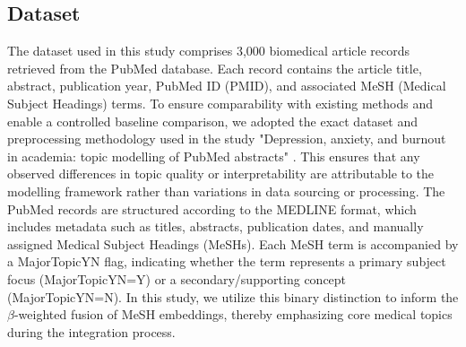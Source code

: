 \documentclass[utf8]{FrontiersinHarvard}
\begin{document}
\subsection{Dataset}
The dataset used in this study comprises 3,000 biomedical article records retrieved from the PubMed database. Each record contains the article title, abstract, publication year, PubMed ID (PMID), and associated MeSH (Medical Subject Headings) terms. To ensure comparability with existing methods and enable a controlled baseline comparison, we adopted the exact dataset and preprocessing methodology used in the study "Depression, anxiety, and burnout in academia: topic modelling of PubMed abstracts" \citep{ma_ai-powered_2025}. This ensures that any observed differences in topic quality or interpretability are attributable to the modelling framework rather than variations in data sourcing or processing.
The PubMed records are structured according to the MEDLINE format, which includes metadata such as titles, abstracts, publication dates, and manually assigned Medical Subject Headings (MeSHs). Each MeSH term is accompanied by a MajorTopicYN flag, indicating whether the term represents a primary subject focus (MajorTopicYN=Y) or a secondary/supporting concept (MajorTopicYN=N). In this study, we utilize this binary distinction to inform the $\beta$-weighted fusion of MeSH embeddings, thereby emphasizing core medical topics during the integration process.

\end{document}
